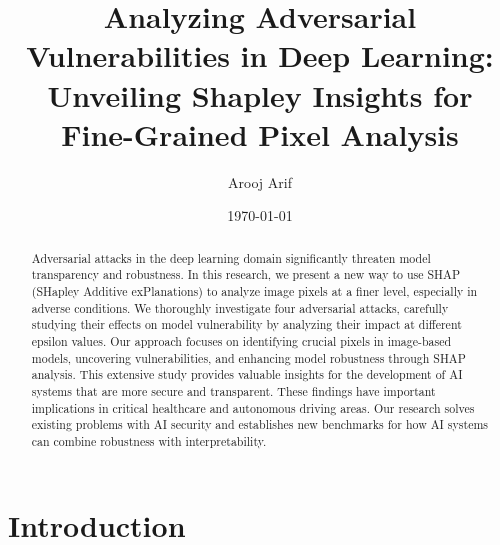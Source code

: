 \documentclass[10pt, conference, a4paper, final]{IEEEtran}
\title{Analyzing Adversarial Vulnerabilities in Deep Learning: Unveiling Shapley Insights for Fine-Grained Pixel Analysis}
\author{Arooj Arif}
\date{\today} %
\begin{document}
\maketitle %


\begin{abstract}    
    Adversarial attacks in the deep learning domain significantly threaten model transparency and robustness. In this research, we present a new way to use SHAP (SHapley Additive exPlanations) to analyze image pixels at a finer level, especially in adverse conditions. We thoroughly investigate four adversarial attacks, carefully studying their effects on model vulnerability by analyzing their impact at different epsilon values. Our approach focuses on identifying crucial pixels in image-based models, uncovering vulnerabilities, and enhancing model robustness through SHAP analysis. This extensive study provides valuable insights for the development of AI systems that are more secure and transparent. These findings have important implications in critical healthcare and autonomous driving areas. Our research solves existing problems with AI security and establishes new benchmarks for how AI systems can combine robustness with interpretability.
\end{abstract}

\section{Introduction}
\end{document}
